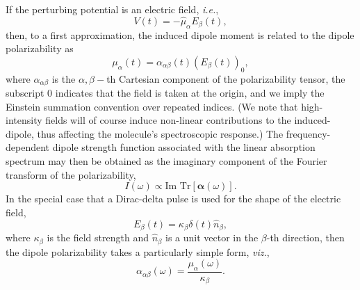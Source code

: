 If the perturbing potential is an electric field, \textit{i.e.}, 
\begin{equation}
V(t) = -\hat{\mu}_\alpha E_\beta(t),
\end{equation}
then, to a first approximation, the induced dipole moment is related to the dipole polarizability as\cite{Buckingham1967,Barron2009}
\begin{equation}
\mu_{\alpha}(t) = \alpha_{\alpha\beta}(t) \left(E_\beta(t)\right)_0,
\end{equation}
where $\alpha_{\alpha\beta}$ is the $\alpha,\beta-$th Cartesian component of the polarizability tensor, the
subscript $0$ indicates that the field is taken at the origin, and we imply the Einstein summation convention over repeated
indices.  (We note that high-intensity fields will of course induce non-linear
contributions to the induced-dipole, thus affecting the molecule's spectroscopic
response.)
The frequency-dependent dipole strength function associated with the linear absorption spectrum may
then be obtained as the imaginary component of the Fourier transform of the polarizability,
\begin{equation}
I(\omega) \propto \textrm{Im\ Tr}\left[ \boldsymbol{\alpha}(\omega) \right].
\end{equation}
In the special case that a Dirac-delta pulse is used for the shape of the electric field,
\begin{equation}
E_\beta(t) = \kappa_\beta \delta(t) \hat{n}_\beta,
\end{equation}
where $\kappa_\beta$ is the field strength and $\hat{n}_\beta$ is a unit vector in the $\beta$-th direction, then the
dipole polarizability takes a particularly simple form, \textit{viz.},
\begin{equation}
\alpha_{\alpha\beta}(\omega) = \frac{\mu_\alpha(\omega)}{\kappa_\beta}.
\end{equation}
